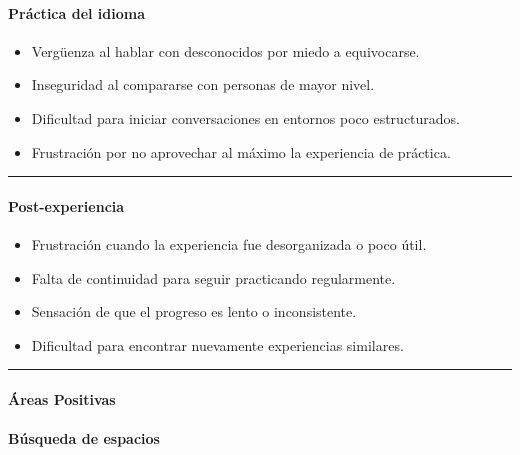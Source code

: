 \paragraph{Práctica del
idioma}\label{report__20-cap2-requirements-analysis.md__pruxe1ctica-del-idioma}

\begin{itemize}
\tightlist
\item
  Vergüenza al hablar con desconocidos por miedo a equivocarse.
\item
  Inseguridad al compararse con personas de mayor nivel.
\item
  Dificultad para iniciar conversaciones en entornos poco estructurados.
\item
  Frustración por no aprovechar al máximo la experiencia de práctica.
\end{itemize}

\begin{center}\rule{0.5\linewidth}{0.5pt}\end{center}

\paragraph{Post-experiencia}\label{report__20-cap2-requirements-analysis.md__post-experiencia}

\begin{itemize}
\tightlist
\item
  Frustración cuando la experiencia fue desorganizada o poco útil.
\item
  Falta de continuidad para seguir practicando regularmente.
\item
  Sensación de que el progreso es lento o inconsistente.
\item
  Dificultad para encontrar nuevamente experiencias similares.
\end{itemize}

\begin{center}\rule{0.5\linewidth}{0.5pt}\end{center}

\paragraph{Áreas
Positivas}\label{report__20-cap2-requirements-analysis.md__uxe1reas-positivas}

\paragraph{Búsqueda de
espacios}\label{report__20-cap2-requirements-analysis.md__buxfasqueda-de-espacios}

